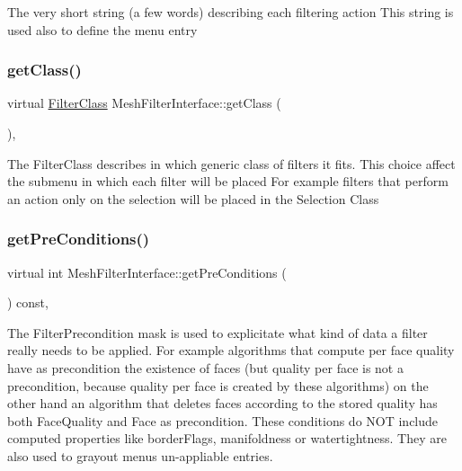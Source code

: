 The very short string (a few words) describing each filtering action This string is used also to define the menu entry \mbox{\label{class_mesh_filter_interface_a56925d19f0d24ffb86b3f2e6b777711c}} 
\subsubsection{\texorpdfstring{get\+Class()}{getClass()}}
{\footnotesize\ttfamily virtual \hyperlink{class_mesh_filter_interface_a67a90dc6ac04fafd04e7cb8c38d0e20f}{Filter\+Class} Mesh\+Filter\+Interface\+::get\+Class (\begin{DoxyParamCaption}\item[{Q\+Action $\ast$}]{ }\end{DoxyParamCaption})\hspace{0.3cm}{\ttfamily [inline]}, {\ttfamily [virtual]}}

The Filter\+Class describes in which generic class of filters it fits. This choice affect the submenu in which each filter will be placed For example filters that perform an action only on the selection will be placed in the Selection Class \mbox{\label{class_mesh_filter_interface_ab9070bf6b4ad6a205641b4c9fa6afaa4}} 
\subsubsection{\texorpdfstring{get\+Pre\+Conditions()}{getPreConditions()}}
{\footnotesize\ttfamily virtual int Mesh\+Filter\+Interface\+::get\+Pre\+Conditions (\begin{DoxyParamCaption}\item[{Q\+Action $\ast$}]{ }\end{DoxyParamCaption}) const\hspace{0.3cm}{\ttfamily [inline]}, {\ttfamily [virtual]}}

The Filter\+Precondition mask is used to explicitate what kind of data a filter really needs to be applied. For example algorithms that compute per face quality have as precondition the existence of faces (but quality per face is not a precondition, because quality per face is created by these algorithms) on the other hand an algorithm that deletes faces according to the stored quality has both Face\+Quality and Face as precondition. These conditions do N\+OT include computed properties like border\+Flags, manifoldness or watertightness. They are also used to grayout menus un-\/appliable entries. \mbox{\label{class_mesh_filter_interface_aa6bcad28fee2de9526b3f01c8ac158a5}} 
